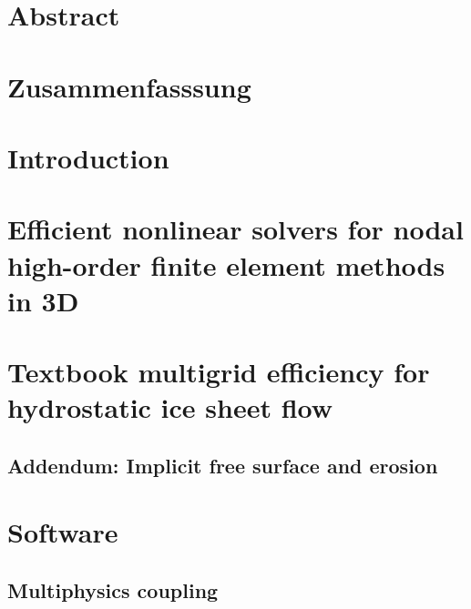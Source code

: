 \documentclass[a4paper,twoside,11pt,pdftex]{report}
\begin{document}
\pagestyle{plain}


\cleardoublepage

\tableofcontents
\listoffigures
\listoftables

\chapter*{Abstract}
\thispagestyle{contents}
\label{sec:abstract}


\chapter*{Zusammenfasssung}
\thispagestyle{contents}
%
\cleardoublepage

\setcounter{page}{1}
\pagestyle{body}

\chapter{Introduction}\label{sec:introduction}


\chapter{Efficient nonlinear solvers for nodal high-order finite element methods in 3D}\label{chap:dohp}

\cleardoublepage

\chapter{Textbook multigrid efficiency for hydrostatic ice sheet flow}\label{chap:tme-ice}

\section{Addendum: Implicit free surface and erosion}\label{sec:tmeiceaddendum}


\cleardoublepage
\chapter{Software}\label{chap:software}

\section{Multiphysics coupling}\label{sec:multiphysics}

\end{document}
